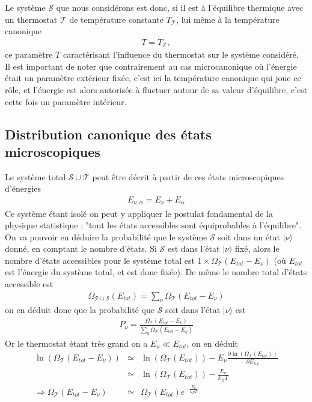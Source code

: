 \documentclass[12pt,prb,aps,epsf]{article}
\begin{document}
Le système $\mathcal{S}$ que nous considérons est donc, si il est à l'équilibre thermique avec un thermostat $\mathcal{T}$ de température constante $T_{\mathcal{T}}$, lui même à la température canonique
\begin{eqnarray}
T = T_{\mathcal{T}},
\end{eqnarray}
ce paramètre $T$ caractérisant l'influence du thermostat sur le système considéré.\\
Il est important de noter que contrairement au cas microcanonique où l'énergie était un paramètre extérieur fixée, c'est ici la température canonique qui joue ce rôle, et l'énergie est alors autorisée à fluctuer autour de sa valeur d'équilibre, c'est cette fois un paramètre intérieur.

\subsection{Distribution canonique des états microscopiques}
Le système total $\mathcal{S} \cup \mathcal{T}$ peut être décrit à partir de ces états microscopiques d'énergies 
\begin{eqnarray}
E_{\nu,\alpha} = E_{\nu} + E_{\alpha}
\end{eqnarray}
Ce système étant isolé on peut y appliquer le postulat fondamental de la physique statistique : "tout les états accessibles sont équiprobables à l'équilibre". On va pouvoir en déduire la probabilité que le système $\mathcal{S}$ soit dans un état $|\nu\rangle$ donné, en comptant le nombre d'états. Si $\mathcal{S}$ est dans l'état $|\nu\rangle$ fixé, alors le nombre d'états accessibles pour le système total est $1\times \Omega_{\mathcal{T}}(E_{tot}-E_{\nu})$ (où $E_{tot}$ est l'énergie du système total, et est donc fixée). De même le nombre total d'états accessible est 
\begin{eqnarray}
\Omega_{\mathcal{T}\cup\mathcal{S}}(E_{tot}) = \sum_{\nu} \Omega_{\mathcal{T}}(E_{tot}-E_{\nu})
\end{eqnarray}
on en déduit donc que la probabilité que $\mathcal{S}$ soit dans l'état $|\nu\rangle$ est 
\begin{eqnarray}
P_{\nu} = \frac{\Omega_{\mathcal{T}}(E_{tot}-E_{\nu})}{\sum_{\eta} \Omega_{\mathcal{T}}(E_{tot}-E_{\eta})}
\end{eqnarray}
Or le thermostat étant très grand on a $E_{\nu}\ll E_{tot}$, on en déduit 
\begin{eqnarray}
\ln (\Omega_{\mathcal{T}}(E_{tot}-E_{\nu})) &\simeq& \ln (\Omega_{\mathcal{T}}(E_{tot})) - E_{\nu} \frac{\partial \ln (\Omega_{\mathcal{T}}(E_{tot}))}{\partial E_{tot}}\\
&\simeq& \ln (\Omega_{\mathcal{T}}(E_{tot})) - \frac{E_{\nu}}{k_BT}\\
\Longrightarrow \Omega_{\mathcal{T}}(E_{tot}-E_{\nu}) &\simeq& \Omega_{\mathcal{T}}(E_{tot}) e^{- \frac{E_{\nu}}{k_BT}}
\end{eqnarray}
\end{document}
